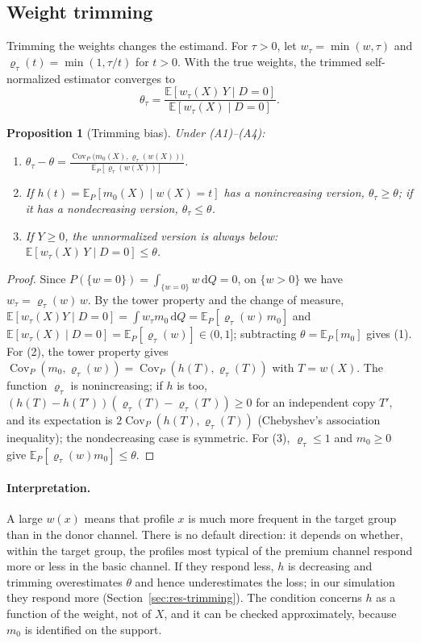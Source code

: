 \documentclass[11pt,a4paper]{article}
\newcommand{\E}{\mathbb{E}}
\newcommand{\dd}{\,\mathrm{d}}
\newcommand{\Cov}{\operatorname{Cov}}
\theoremstyle{plain}
\newtheorem{proposition}{Proposition}
\theoremstyle{definition}
\begin{document}
\subsection{Weight trimming}\label{sec:trimming}

Trimming the weights changes the estimand. For $\tau>0$, let $w_\tau=\min(w,\tau)$ and $\varrho_\tau(t)=\min(1,\tau/t)$ for $t>0$. With the true weights, the trimmed self-normalized estimator converges to
\[
\theta_\tau=\frac{\E[w_\tau(X)\,Y\mid D=0]}{\E[w_\tau(X)\mid D=0]}.
\]

\begin{proposition}[Trimming bias]\label{prop:trimming}
Under (A1)--(A4):
\begin{enumerate}
  \item $\displaystyle\theta_\tau-\theta=\frac{\Cov_P\bigl(m_0(X),\varrho_\tau(w(X))\bigr)}{\E_P[\varrho_\tau(w(X))]}$.
  \item If $h(t)=\E_P[m_0(X)\mid w(X)=t]$ has a nonincreasing version, $\theta_\tau\ge\theta$; if it has a nondecreasing version, $\theta_\tau\le\theta$.
  \item If $Y\ge0$, the unnormalized version is always below: $\E[w_\tau(X)\,Y\mid D=0]\le\theta$.
\end{enumerate}
\end{proposition}
\begin{proof}
Since $P(\{w=0\})=\int_{\{w=0\}}w\dd Q=0$, on $\{w>0\}$ we have $w_\tau=\varrho_\tau(w)\,w$. By the tower property and the change of measure, $\E[w_\tau(X)Y\mid D=0]=\int w_\tau m_0\dd Q=\E_P[\varrho_\tau(w)\,m_0]$ and $\E[w_\tau(X)\mid D=0]=\E_P[\varrho_\tau(w)]\in(0,1]$; subtracting $\theta=\E_P[m_0]$ gives (1). For (2), the tower property gives $\Cov_P(m_0,\varrho_\tau(w))=\Cov_P(h(T),\varrho_\tau(T))$ with $T=w(X)$. The function $\varrho_\tau$ is nonincreasing; if $h$ is too, $(h(T)-h(T'))(\varrho_\tau(T)-\varrho_\tau(T'))\ge0$ for an independent copy $T'$, and its expectation is $2\Cov_P(h(T),\varrho_\tau(T))$ (Chebyshev's association inequality); the nondecreasing case is symmetric. For (3), $\varrho_\tau\le1$ and $m_0\ge0$ give $\E_P[\varrho_\tau(w)m_0]\le\theta$.
\end{proof}

\paragraph{Interpretation.} A large $w(x)$ means that profile $x$ is much more frequent in the target group than in the donor channel. There is no default direction: it depends on whether, within the target group, the profiles most typical of the premium channel respond more or less in the basic channel. If they respond less, $h$ is decreasing and trimming overestimates $\theta$ and hence underestimates the loss; in our simulation they respond more (Section~\ref{sec:res-trimming}). The condition concerns $h$ as a function of the weight, not of $X$, and it can be checked approximately, because $m_0$ is identified on the support.
\end{document}
